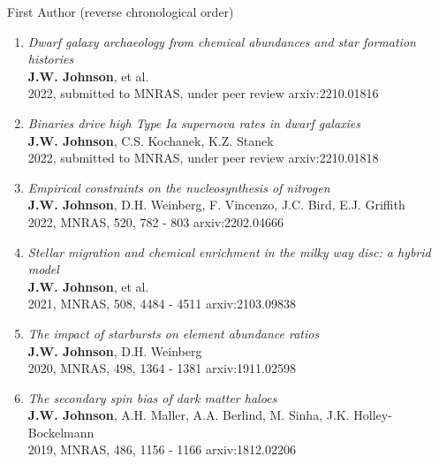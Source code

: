 \documentclass[cv.tex]{subfiles}
\begin{document}

\vspace{-3mm}
\noindent
{\color{themecolor} \large First Author}
(reverse chronological order)
\par\noindent
\begin{enumerate}

	\vspace{-3mm}

	\item \textit{Dwarf galaxy archaeology from chemical abundances and star
	formation histories}
	\\
	\textbf{J.W. Johnson}, et al.
	\\
	2022, submitted to MNRAS, under peer review \hfill arxiv:2210.01816

	\item \textit{Binaries drive high Type Ia supernova rates in dwarf
	galaxies}
	\\
	\textbf{J.W. Johnson}, C.S. Kochanek, K.Z. Stanek
	\\
	2022, submitted to MNRAS, under peer review \hfill arxiv:2210.01818

	\item \textit{Empirical constraints on the nucleosynthesis of nitrogen}
	\\
	\textbf{J.W. Johnson}, D.H. Weinberg, F. Vincenzo, J.C. Bird, E.J. Griffith
	\\
	2022, MNRAS, 520, 782 - 803 \hfill arxiv:2202.04666

	\item \textit{Stellar migration and chemical enrichment in the milky way
	disc: a hybrid model}
	\\
	\textbf{J.W. Johnson}, et al.
	\\
	2021, MNRAS, 508, 4484 - 4511 \hfill arxiv:2103.09838

	\item \textit{The impact of starbursts on element abundance ratios}
	\\
	\textbf{J.W. Johnson}, D.H. Weinberg
	\\
	2020, MNRAS, 498, 1364 - 1381 \hfill arxiv:1911.02598

	\item \textit{The secondary spin bias of dark matter haloes}
	\\
	\textbf{J.W. Johnson}, A.H. Maller, A.A. Berlind, M. Sinha,
	J.K. Holley-Bockelmann
	\\
	2019, MNRAS, 486, 1156 - 1166 \hfill arxiv:1812.02206

\end{enumerate}
\end{document}
